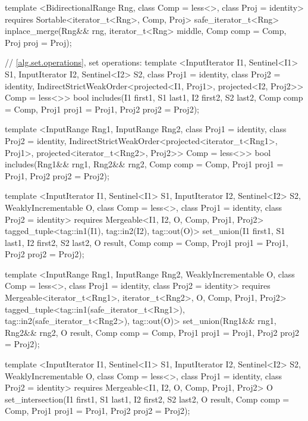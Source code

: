 \begin{codeblock}
{{{{  template <BidirectionalRange Rng, class Comp = less<>, class Proj = identity>
    requires Sortable<iterator_t<Rng>, Comp, Proj>
    safe_iterator_t<Rng>
      inplace_merge(Rng&& rng, iterator_t<Rng> middle, Comp comp = Comp{},
                    Proj proj = Proj{});

  // \ref{alg.set.operations}, set operations:
  template <InputIterator I1, Sentinel<I1> S1, InputIterator I2, Sentinel<I2> S2,
      class Proj1 = identity, class Proj2 = identity,
      IndirectStrictWeakOrder<projected<I1, Proj1>, projected<I2, Proj2>> Comp = less<>>
    bool
      includes(I1 first1, S1 last1, I2 first2, S2 last2, Comp comp = Comp{},
               Proj1 proj1 = Proj1{}, Proj2 proj2 = Proj2{});

  template <InputRange Rng1, InputRange Rng2, class Proj1 = identity,
      class Proj2 = identity,
      IndirectStrictWeakOrder<projected<iterator_t<Rng1>, Proj1>,
        projected<iterator_t<Rng2>, Proj2>> Comp = less<>>
    bool
      includes(Rng1&& rng1, Rng2&& rng2, Comp comp = Comp{},
               Proj1 proj1 = Proj1{}, Proj2 proj2 = Proj2{});

  template <InputIterator I1, Sentinel<I1> S1, InputIterator I2, Sentinel<I2> S2,
      WeaklyIncrementable O, class Comp = less<>, class Proj1 = identity, class Proj2 = identity>
    requires Mergeable<I1, I2, O, Comp, Proj1, Proj2>
    tagged_tuple<tag::in1(I1), tag::in2(I2), tag::out(O)>
      set_union(I1 first1, S1 last1, I2 first2, S2 last2, O result, Comp comp = Comp{},
                Proj1 proj1 = Proj1{}, Proj2 proj2 = Proj2{});

  template <InputRange Rng1, InputRange Rng2, WeaklyIncrementable O,
      class Comp = less<>, class Proj1 = identity, class Proj2 = identity>
    requires Mergeable<iterator_t<Rng1>, iterator_t<Rng2>, O, Comp, Proj1, Proj2>
    tagged_tuple<tag::in1(safe_iterator_t<Rng1>),
                 tag::in2(safe_iterator_t<Rng2>),
                 tag::out(O)>
      set_union(Rng1&& rng1, Rng2&& rng2, O result, Comp comp = Comp{},
                Proj1 proj1 = Proj1{}, Proj2 proj2 = Proj2{});

  template <InputIterator I1, Sentinel<I1> S1, InputIterator I2, Sentinel<I2> S2,
      WeaklyIncrementable O, class Comp = less<>, class Proj1 = identity, class Proj2 = identity>
    requires Mergeable<I1, I2, O, Comp, Proj1, Proj2>
    O
      set_intersection(I1 first1, S1 last1, I2 first2, S2 last2, O result,
                       Comp comp = Comp{}, Proj1 proj1 = Proj1{}, Proj2 proj2 = Proj2{});

}}}}
\end{codeblock}
